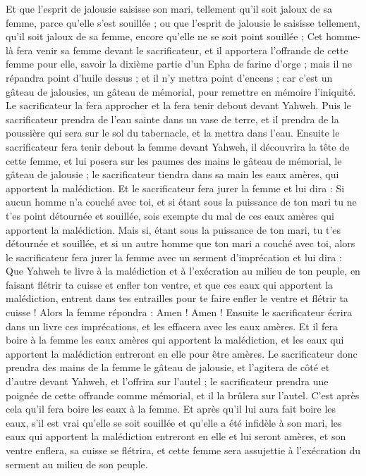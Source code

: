 \begin{multicols}{2}
Et que l'esprit de jalousie saisisse son mari, tellement qu'il soit jaloux de sa femme, parce qu'elle s'est souillée ; ou que l'esprit de jalousie le saisisse tellement, qu'il soit jaloux de sa femme, encore qu'elle ne se soit point souillée ;
Cet homme-là fera venir sa femme devant le sacrificateur, et il apportera l'offrande de cette femme pour elle, savoir la dixième partie d'un Epha de farine d'orge ; mais il ne répandra point d'huile dessus ; et il n'y mettra point d'encens ; car c'est un gâteau de jalousies, un gâteau de mémorial, pour remettre en mémoire l'iniquité.
Le sacrificateur la fera approcher et la fera tenir debout devant Yahweh.
Puis le sacrificateur prendra de l'eau sainte dans un vase de terre, et il prendra de la poussière qui sera sur le sol du tabernacle, et la mettra dans l'eau.
Ensuite le sacrificateur fera tenir debout la femme devant Yahweh, il découvrira la tête de cette femme, et lui posera sur les paumes des mains le gâteau de mémorial, le gâteau de jalousie ; le sacrificateur tiendra dans sa main les eaux amères, qui apportent la malédiction.
Et le sacrificateur fera jurer la femme et lui dira : Si aucun homme n'a couché avec toi, et si étant sous la puissance de ton mari tu ne t'es point détournée et souillée, sois exempte du mal de ces eaux amères qui apportent la malédiction.
Mais si, étant sous la puissance de ton mari, tu t'es détournée et souillée, et si un autre homme que ton mari a couché avec toi,
alors le sacrificateur fera jurer la femme avec un serment d'imprécation et lui dira : Que Yahweh te livre à la malédiction et à l'exécration au milieu de ton peuple, en faisant flétrir ta cuisse et enfler ton ventre,
et que ces eaux qui apportent la malédiction, entrent dans tes entrailles pour te faire enfler le ventre et flétrir ta cuisse ! Alors la femme répondra : Amen ! Amen !
Ensuite le sacrificateur écrira dans un livre ces imprécations, et les effacera avec les eaux amères.
Et il fera boire à la femme les eaux amères qui apportent la malédiction, et les eaux qui apportent la malédiction entreront en elle pour être amères.
Le sacrificateur donc prendra des mains de la femme le gâteau de jalousie, et l'agitera de côté et d'autre devant Yahweh, et l'offrira sur l'autel ;
le sacrificateur prendra une poignée de cette offrande comme mémorial, et il la brûlera sur l'autel. C'est après cela qu'il fera boire les eaux à la femme.
Et après qu'il lui aura fait boire les eaux, s'il est vrai qu'elle se soit souillée et qu'elle a été infidèle à son mari, les eaux qui apportent la malédiction entreront en elle et lui seront amères, et son ventre enflera, sa cuisse se flétrira, et cette femme sera assujettie à l'exécration du serment au milieu de son peuple.

\end{multicols}
